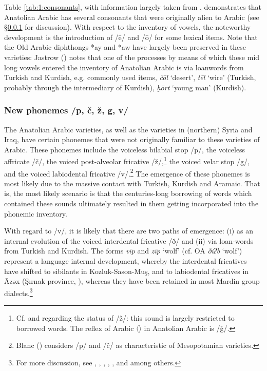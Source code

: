 \documentclass[output=paper]{langsci/langscibook}
\begin{document}
Table \ref{tab:1:consonants}, with information largely taken from \cite{Jastrow2011anatolian}, demonstrates that Anatolian Arabic has several consonants that were originally alien to Arabic (see §\ref{newsounds} for discussion). With respect to the inventory of vowels, the noteworthy development is the introduction of /\={e}/ and /\={o}/ for some lexical items. Note that the Old Arabic diphthongs *ay and *aw have largely been preserved in these varieties: Jastrow (\citeyear[89]{Jastrow2011anatolian}) notes that one of the processes by means of which these mid long vowels entered the inventory of Anatolian Arabic is via loanwords from Turkish and Kurdish, e.g. commonly used items, \textit{\v{c}\={o}l} `desert', \textit{t\={e}l} `wire' (Turkish, probably through the intermediary of Kurdish), \textit{ḫ\={o}rt} `young man' (Kurdish).  


\subsubsection{New phonemes /p, \v{c}, ž, g, v/}\label{newsounds}
The Anatolian Arabic varieties, as well as the varieties in (northern) Syria and Iraq, have certain phonemes that were not originally familiar to these varieties of Arabic. These phonemes include the voiceless bilabial stop /p/, the voiceless affricate /\v{c}/, the voiced post-alveolar fricative /ž/,\footnote{Cf. \cite{Jastrow2011anatolian} and \cite{GrigoreBituna2012} regarding the status of /ž/: this sound is largely restricted to borrowed words. The reflex of Arabic 〈{}〉 in Anatolian Arabic is /\v{g}/.} the voiced velar stop /g/, and the voiced labiodental fricative /v/.\footnote{Blanc (\citeyear[6--7]{Blanc1964}) considers /p/ and /\v{c}/ as characteristic of Mesopotamian varieties.} The emergence of these phonemes is most likely due to the massive contact with Turkish, Kurdish and Aramaic. That is, the most likely scenario is that the centuries-long borrowing of words which contained these sounds ultimately resulted in them getting incorporated into the phonemic inventory. 


With regard to /v/, it is likely that there are two paths of emergence: (i) as an internal evolution of the voiced interdental fricative /ð/ and (ii) via loan-words from Turkish and Kurdish. The forms \textit{vīp} and \textit{zīp} `wolf' (cf. OA \textit{ðiʔb} `wolf') represent a language internal development, whereby the interdental fricatives have shifted to sibilants in Kozluk-Sason-Mu\c{s}, and to labiodental fricatives in \={A}zəx (\c{S}{\i}rnak province, \citealt{Wittrich2001}), whereas they have been retained in most Mardin group dialects.\footnote{For more discussion, see \citet{Wittrich2001}, \citet{Jastrow2011anatolian}, \citet{Grigore2007article}, \citet{Talay2011}, \citet{Akkus2017}, and \cite{Bituna2016} among others. } 
\end{document}
